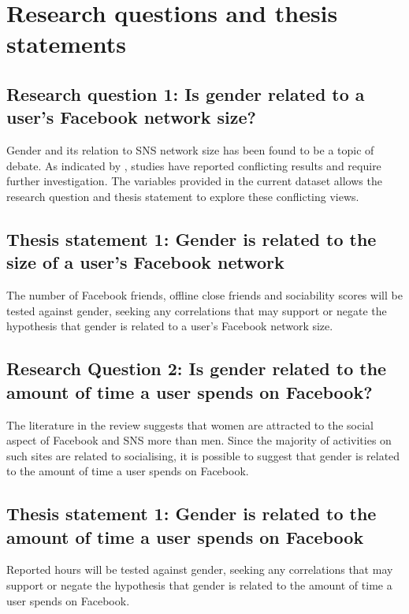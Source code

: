 \section{Research questions and thesis statements}

\subsection{Research question 1: Is gender related to a user's Facebook network size?}

Gender and its relation to SNS network size has been found to be a topic of debate. As indicated by \citet{Tifferet2014}, studies have reported conflicting results and require further investigation. The variables provided in the current dataset allows the research question and thesis statement to explore these conflicting views.

\subsection{Thesis statement 1: Gender is related to the size of a user's Facebook network}

The number of Facebook friends, offline close friends and sociability scores will be tested against gender, seeking any correlations that may support or negate the hypothesis that gender is related to a user's Facebook network size. 

\subsection{Research Question 2: Is gender related to the amount of time a user spends on Facebook?}

The literature in the review suggests that women are attracted to the social aspect of Facebook and SNS more than men. Since the majority of activities on such sites are related to socialising, it is possible to suggest that gender is related to the amount of time a user spends on Facebook.

\subsection{Thesis statement 1: Gender is related to the amount of time a user spends on Facebook}

Reported hours will be tested against gender, seeking any correlations that may support or negate the hypothesis that gender is related to the amount of time a user spends on Facebook.

